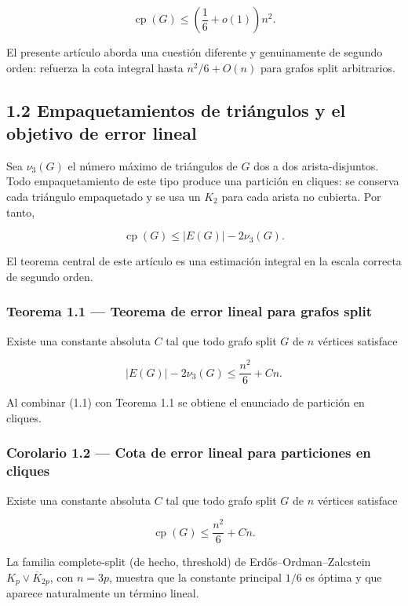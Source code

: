 \documentclass[
  11pt,
]{article}
\begin{document}
\[
\operatorname{cp}(G)
\le
\left(\frac16+o(1)\right)n^2.
\]

El presente artículo aborda una cuestión diferente y genuinamente de
segundo orden: refuerza la cota integral hasta \(n^2/6+O(n)\) para
grafos split arbitrarios.

\subsection{1.2 Empaquetamientos de triángulos y el objetivo de error
lineal}\label{empaquetamientos-de-triuxe1ngulos-y-el-objetivo-de-error-lineal}

Sea \(\nu_3(G)\) el número máximo de triángulos de \(G\) dos a dos
arista-disjuntos. Todo empaquetamiento de este tipo produce una
partición en cliques: se conserva cada triángulo empaquetado y se usa un
\(K_2\) para cada arista no cubierta. Por tanto,

\[
\operatorname{cp}(G)
\le
|E(G)|-2\nu_3(G).
\tag{1.1}
\]

El teorema central de este artículo es una estimación integral en la
escala correcta de segundo orden.

\subsubsection{Teorema 1.1 --- Teorema de error lineal para grafos
split}\label{teorema-1.1-teorema-de-error-lineal-para-grafos-split}

Existe una constante absoluta \(C\) tal que todo grafo split \(G\) de
\(n\) vértices satisface

\[
\boxed{
|E(G)|-2\nu_3(G)
\le
\frac{n^2}{6}+Cn.
}
\tag{1.2}
\]

Al combinar (1.1) con Teorema 1.1 se obtiene el enunciado de partición
en cliques.

\subsubsection{Corolario 1.2 --- Cota de error lineal para particiones
en
cliques}\label{corolario-1.2-cota-de-error-lineal-para-particiones-en-cliques}

Existe una constante absoluta \(C\) tal que todo grafo split \(G\) de
\(n\) vértices satisface

\[
\boxed{
\operatorname{cp}(G)
\le
\frac{n^2}{6}+Cn.
}
\tag{1.3}
\]

La familia complete-split (de hecho, threshold) de
Erdős--Ordman--Zalcstein \(K_p\vee\overline K_{2p}\), con \(n=3p\),
muestra que la constante principal \(1/6\) es óptima y que aparece
naturalmente un término lineal.
\end{document}
